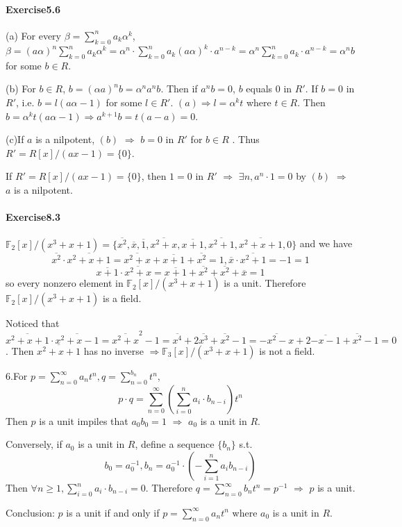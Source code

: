 \documentclass{article}
\begin{document}
\paragraph{Exercise5.6}
(a) For every  $ \beta=\sum_{k=0}^n a_k\alpha^k $, $ \beta=(a\alpha)^n \sum_{k=0}^n a_k\alpha^k=\alpha^n\cdot \sum_{k=0 }^{n }a_k(a\alpha)^k\cdot a^{n-k}=\alpha^n\sum_{k=0 }^{n }a_k\cdot a^{n-k}=\alpha^nb$ for some  $ b\in R  $.

(b) For  $ b\in R  $,  $ b=(\alpha a)^n b= \alpha^n a^n b $. Then if  $ a^nb=0  $,  $ b   $ equals 0 in  $ R' $. If  $ b=0  $ in  $ R' $, i.e.  $ b=l(a\alpha-1) $ for some  $ l\in R'  $.  $ (a)\Rightarrow l=\alpha^k t  $ where  $ t\in R  $. Then  $ b=\alpha^kt(a\alpha -1) \Rightarrow a^{k+1}b=t(a-a)=0$.

(c)If  $ a  $ is a nilpotent,  $ (b)  $  $ \Rightarrow  $  $ b=0  $ in  $ R'  $ for  $ b\in R  $ . Thus  $ R'=R[x]/(ax-1)=\{0\} $.

If  $ R'=R[x]/(ax-1)=\{0\} $, then  $ 1=0  $ in  $ R'  $ $ \Rightarrow $   $ \exists n, a^n\cdot 1=0 $ by  $ (b)  $ $ \Rightarrow   $  $ a  $ is a nilpotent.

\paragraph{Exercise8.3}
 $ \mathbb{F}_2[x]/(x^3+x+1)=\{\overline{x^2},\overline{x},\overline{1},\overline{x^2+x},\overline{x+1},\overline{x^2+1},\overline{x^2+x+1},0\} $ and we have
 \[\overline{x^2}\cdot\overline{x^2+x+1}=\overline{x^2+x}+\overline{x+1}+\overline{x^2}=1,\overline{x}\cdot\overline{x^2+1}=-1=1\]
 \[\overline{x+1}\cdot\overline{x^2+x}=\overline{x+1}+\overline{x^2}+\overline{x^2}+\overline{x}=1\]
 so every nonzero element in  $ \mathbb{F}_2[x]/(x^3+x+1) $ is a unit. Therefore  $ \mathbb{F}_2[x]/(x^3+x+1) $ is a field.

Noticed that  $ \overline{x^2+x+1}\cdot \overline{x^2+x-1}=\overline{x^2+x}^2-1=\overline{x^4}+2\overline{x^3}+\overline{x^2}-1=\overline{-x^2-x}+2\overline{-x-1}+\overline{x^2}-1=0$. Then  $ \overline{x^2+x+1} $ has no inverse $ \Rightarrow \mathbb{F}_3[x]/(x^3+x+1) $ is not a field.

6.For  $ p=\sum_{n=0}^{\infty}a_nt^n,q=\sum_{n=0}^{b_n}t^n $, 
\[p\cdot q=\sum_{n=0}^{\infty}(\sum_{i=0}^n a_i\cdot b_{n-i})t^n\] 
Then  $ p  $ is a unit impiles that  $ a_0b_0=1 $  $ \Rightarrow  $  $ a_0  $ is a unit in  $ R $.

Conversely, if  $ a_0  $ is a unit in  $ R  $, define a sequence $ \{b_n\} $ s.t.
\[b_0=a_0^{-1},b_n=a_0^{-1}\cdot (-\sum_{i=1}^n a_ib_{n-i})\]
Then  $ \forall n \geq 1, \sum_{i=0}^n a_i\cdot b_{n-i}=0  $.
Therefore  $ q=\sum_{n=0}^\infty b_nt^n=p^{-1}  $  $ \Rightarrow   $  $ p  $ is a unit.

Conclusion:  $ p $ is a unit if and only if  $ p=\sum_{n=0}^\infty a_nt^n  $ where  $ a_0  $ is a unit in  $ R  $.  
\end{document}
